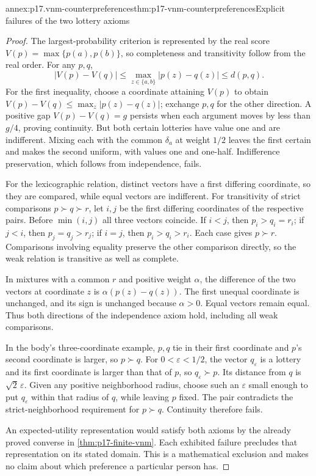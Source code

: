 \begin{annexitem}{annex:p17.vnm-counterpreferences}{thm:p17-vnm-counterpreferences}{Explicit failures of the two lottery axioms}
\begin{proof}
The largest-probability criterion is represented by the real score
\(V(p)=\max\{p(a),p(b)\}\), so completeness and transitivity follow
from the real order. For any \(p,q\),
\[
                   |V(p)-V(q)|\leq\max_{z\in\{a,b\}}|p(z)-q(z)|
                                        \leq d(p,q).
\]
For the first inequality, choose a coordinate attaining \(V(p)\)
to obtain \(V(p)-V(q)\leq\max_z|p(z)-q(z)|\); exchange \(p,q\)
for the other direction. A positive gap \(V(p)-V(q)=g\) persists
when each argument moves by less than \(g/4\), proving continuity.
But both certain lotteries have value one and are indifferent. Mixing
each with the common \(\delta_a\) at weight \(1/2\) leaves the
first certain and makes the second uniform, with values one and one-half.
Indifference preservation, which follows from independence, fails.

For the lexicographic relation, distinct vectors have a first differing
coordinate, so they are compared, while equal vectors are indifferent.
For transitivity of strict comparisons \(p\succ q\succ r\), let
\(i,j\) be the first differing coordinates of the respective pairs.
Before \(\min(i,j)\) all three vectors coincide. If \(i<j\),
then \(p_i>q_i=r_i\); if \(j<i\), then \(p_j=q_j>r_j\);
if \(i=j\), then \(p_i>q_i>r_i\). Each case gives \(p\succ r\).
Comparisons involving equality preserve the other comparison directly,
so the weak relation is transitive as well as complete.

In mixtures with a common \(r\) and positive weight \(\alpha\),
the difference of the two vectors at coordinate \(z\) is
\(\alpha(p(z)-q(z))\). The first unequal coordinate is unchanged,
and its sign is unchanged because \(\alpha>0\). Equal vectors remain
equal. Thus both directions of the independence axiom hold, including
all weak comparisons.

In the body's three-coordinate example, \(p,q\) tie in their first
coordinate and \(p\)'s second coordinate is larger, so \(p\succ q\).
For \(0<\varepsilon<1/2\), the vector \(q_\varepsilon\) is a
lottery and its first coordinate is larger than that of \(p\), so
\(q_\varepsilon\succ p\). Its distance from \(q\) is
\(\sqrt2\,\varepsilon\). Given any positive neighborhood radius,
choose such an \(\varepsilon\) small enough to put
\(q_\varepsilon\) within that radius of \(q\), while leaving
\(p\) fixed. The pair contradicts the strict-neighborhood requirement
for \(p\succ q\). Continuity therefore fails.

An expected-utility representation would satisfy both axioms by the
already proved converse in \cref{thm:p17-finite-vnm}. Each exhibited
failure precludes that representation on its stated domain. This is a
mathematical exclusion and makes no claim about which preference a
particular person has.
\end{proof}
\end{annexitem}
